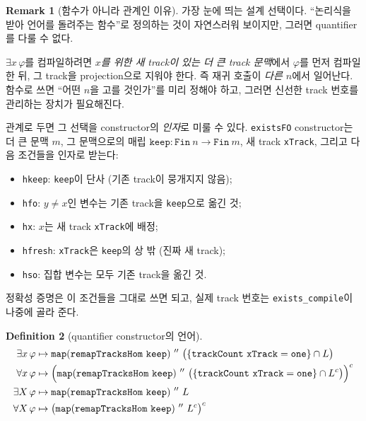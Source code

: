 \documentclass[11pt]{article}
\theoremstyle{definition}
\newtheorem{definition}{Definition}[section]
\newtheorem{remark}[definition]{Remark}
\theoremstyle{plain}
\newcommand{\lean}[1]{\texttt{#1}}
\begin{document}
\begin{remark}[함수가 아니라 관계인 이유]
\label{aut:rem:whyrelation}
가장 눈에 띄는 설계 선택이다. ``논리식을 받아 언어를 돌려주는 함수''로
정의하는 것이 자연스러워 보이지만, 그러면 quantifier를 다룰 수 없다.

$\exists x\, \varphi$를 컴파일하려면 \emph{$x$를 위한 새 track이 있는 더 큰
track 문맥}에서 $\varphi$를 먼저 컴파일한 뒤, 그 track을 projection으로
지워야 한다. 즉 재귀 호출이 \emph{다른 $n$}에서 일어난다. 함수로 쓰면
``어떤 $n$을 고를 것인가''를 미리 정해야 하고, 그러면 신선한 track 번호를
관리하는 장치가 필요해진다.

관계로 두면 그 선택을 constructor의 \emph{인자}로 미룰 수 있다.
\lean{existsFO} constructor는 더 큰 문맥 $m$, 그 문맥으로의 매립
$\lean{keep} : \lean{Fin}\ n \to \lean{Fin}\ m$, 새 track \lean{xTrack},
그리고 다음 조건들을 인자로 받는다:
\begin{itemize}
  \item \lean{hkeep}: \lean{keep}이 단사 (기존 track이 뭉개지지 않음);
  \item \lean{hfo}: $y \ne x$인 변수는 기존 track을 \lean{keep}으로 옮긴 것;
  \item \lean{hx}: $x$는 새 track \lean{xTrack}에 배정;
  \item \lean{hfresh}: \lean{xTrack}은 \lean{keep}의 상 밖 (진짜 새 track);
  \item \lean{hso}: 집합 변수는 모두 기존 track을 옮긴 것.
\end{itemize}
정확성 증명은 이 조건들을 그대로 쓰면 되고, 실제 track 번호는
\lean{exists\_compile}이 나중에 골라 준다.
\end{remark}

\begin{definition}[quantifier constructor의 언어]
\label{aut:def:quantifierlanguages}
\begin{align*}
  \exists x\, \varphi &\mapsto
    \lean{map}(\lean{remapTracksHom}\ \lean{keep})\ ''\
      \bigl(\{\lean{trackCount}\ \lean{xTrack} = \lean{one}\} \cap L\bigr) \\
  \forall x\, \varphi &\mapsto
    \Bigl(\lean{map}(\lean{remapTracksHom}\ \lean{keep})\ ''\
      \bigl(\{\lean{trackCount}\ \lean{xTrack} = \lean{one}\} \cap L^c\bigr)\Bigr)^c \\
  \exists X\, \varphi &\mapsto
    \lean{map}(\lean{remapTracksHom}\ \lean{keep})\ ''\ L \\
  \forall X\, \varphi &\mapsto
    \bigl(\lean{map}(\lean{remapTracksHom}\ \lean{keep})\ ''\ L^c\bigr)^c
\end{align*}
\end{definition}
\end{document}
